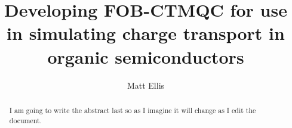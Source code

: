  \makeatletter
\renewcommand {\@degree@string} {Master of Philosophy to Doctor of Philosophy}
 \makeatother

\title{Developing FOB-CTMQC for use in simulating charge transport in organic semiconductors}
\author{Matt Ellis}

\maketitle

\begin{abstract} %
I am going to write the abstract last so as I imagine it will change as I edit the document.
\end{abstract}

\setcounter{tocdepth}{2}

\tableofcontents

